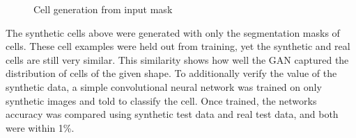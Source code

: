 \documentclass[ms,electronic,oneside,twosidetoc,letterpaper,chaptercenter,parttop]{byumsphd}
\begin{document}
\begin{figure}[H]
   \quad
   \quad
   \quad
   \quad
  \caption{Cell generation from input mask}
\end{figure}

The synthetic cells above were generated with only the segmentation masks of cells. These cell examples were held out from training, yet the synthetic and real cells are still very similar. This similarity shows how well the GAN captured the distribution of cells of the given shape. To additionally verify
the value of the synthetic data, a simple convolutional neural network was trained on only synthetic images
and told to classify the cell. Once trained, the networks accuracy was compared using synthetic test data and real test
data, and both were within 1\%.

\end{document}
